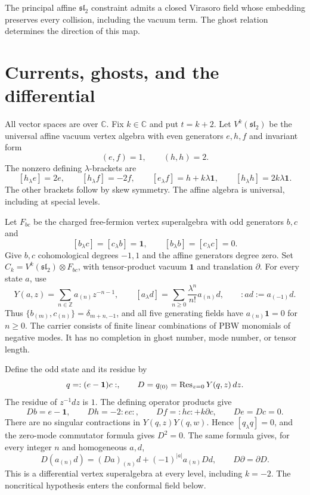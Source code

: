 The principal affine $\mathfrak{sl}_2$ constraint admits a closed Virasoro field whose embedding preserves every collision, including the vacuum term.
The ghost relation determines the direction of this map.

\section{Currents, ghosts, and the differential}

All vector spaces are over $\mathbb C$.
Fix $k\in\mathbb C$ and put $t=k+2$.
Let $V^k(\mathfrak{sl}_2)$ be the universal affine vacuum vertex algebra with even generators $e,h,f$ and invariant form
\[
 (e,f)=1,\qquad (h,h)=2.
\]
The nonzero defining $\lambda$-brackets are
\begin{equation}\label{eq:affine-brackets}
 [h_\lambda e]=2e,\qquad [h_\lambda f]=-2f,
 \qquad [e_\lambda f]=h+k\lambda\mathbf1,
 \qquad [h_\lambda h]=2k\lambda\mathbf1.
\end{equation}
The other brackets follow by skew symmetry.
The affine algebra is universal, including at special levels.

Let $F_{bc}$ be the charged free-fermion vertex superalgebra with odd generators $b,c$ and
\[
 [b_\lambda c]=[c_\lambda b]=\mathbf1,
 \qquad [b_\lambda b]=[c_\lambda c]=0.
\]
Give $b,c$ cohomological degrees $-1,1$ and the affine generators degree zero.
Set $C_k=V^k(\mathfrak{sl}_2)\otimes F_{bc}$, with tensor-product vacuum $\mathbf1$ and translation $\partial$.
For every state $a$, use
\[
 Y(a,z)=\sum_{n\in\mathbb Z}a_{(n)}z^{-n-1},\qquad
 [a_\lambda d]=\sum_{n\geq0}\frac{\lambda^n}{n!}a_{(n)}d,
 \qquad :ad:=a_{(-1)}d.
\]
Thus $\{b_{(m)},c_{(n)}\}=\delta_{m+n,-1}$, and all five generating fields have $a_{(n)}\mathbf1=0$ for $n\geq0$.
The carrier consists of finite linear combinations of PBW monomials of negative modes.
It has no completion in ghost number, mode number, or tensor length.

Define the odd state and its residue by
\begin{equation}\label{eq:ds-charge}
 q=:(e-\mathbf1)c:,
 \qquad D=q_{(0)}=\operatorname{Res}_{z=0}Y(q,z)\,dz.
\end{equation}
The residue of $z^{-1}dz$ is $1$.
The defining operator products give
\begin{equation}\label{eq:ds-differential}
 Db=e-\mathbf1,\qquad Dh=-2:ec:,
 \qquad Df=:hc:+k\partial c,
 \qquad De=Dc=0.
\end{equation}
There are no singular contractions in $Y(q,z)Y(q,w)$.
Hence $[q_\lambda q]=0$, and the zero-mode commutator formula gives $D^2=0$.
The same formula gives, for every integer $n$ and homogeneous $a,d$,
\begin{equation}\label{eq:ds-derivation}
 D(a_{(n)}d)=(Da)_{(n)}d+(-1)^{|a|}a_{(n)}Dd,
 \qquad D\partial=\partial D.
\end{equation}
This is a differential vertex superalgebra at every level, including $k=-2$.
The noncritical hypothesis enters the conformal field below.

